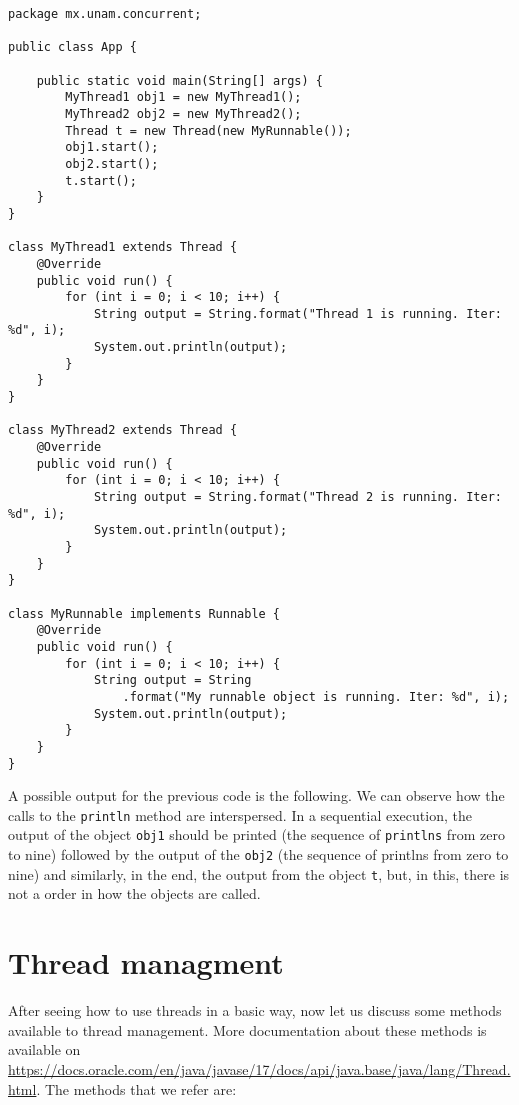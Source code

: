 \documentclass{latex/classes/myarticle}
\begin{document}
\begin{lstlisting}
package mx.unam.concurrent;

public class App {

    public static void main(String[] args) {
        MyThread1 obj1 = new MyThread1();
        MyThread2 obj2 = new MyThread2();
        Thread t = new Thread(new MyRunnable());
        obj1.start();
        obj2.start();
        t.start();
    }
}

class MyThread1 extends Thread {
    @Override
    public void run() {
        for (int i = 0; i < 10; i++) {
            String output = String.format("Thread 1 is running. Iter: %d", i);
            System.out.println(output);
        }
    }
}

class MyThread2 extends Thread {
    @Override
    public void run() {
        for (int i = 0; i < 10; i++) {
            String output = String.format("Thread 2 is running. Iter: %d", i);
            System.out.println(output);
        }
    }
}

class MyRunnable implements Runnable {
    @Override
    public void run() {
        for (int i = 0; i < 10; i++) {
            String output = String
                .format("My runnable object is running. Iter: %d", i);
            System.out.println(output);
        }
    }
}
\end{lstlisting}

A possible output for the previous code is the following. We can observe how
the calls to the \texttt{println} method are interspersed. In a sequential execution,
the output of the object \texttt{obj1} should be printed (the sequence of \texttt{printlns}
from zero to nine) followed by the output of the \texttt{obj2} (the sequence of
printlns from zero to nine) and similarly, in the end, the output from the
object \texttt{t}, but, in this, there is not a order in how the objects are
called.

\section{Thread managment}
\label{sec:orgd27c42d}

After seeing how to use threads in a basic way, now let us discuss some
methods available to thread management. More documentation about these
methods is available on
\url{https://docs.oracle.com/en/java/javase/17/docs/api/java.base/java/lang/Thread.html}.
The methods that we refer are:
\end{document}
